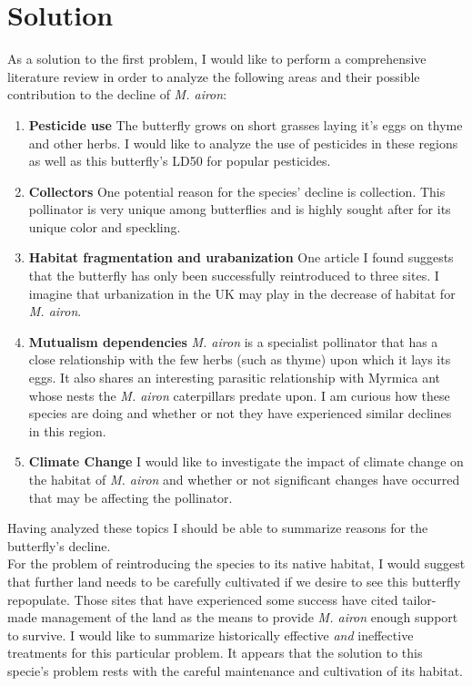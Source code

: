 \documentclass[12pt, twocolumn, letterpaper]{article}
\begin{document}
\section*{Solution}
As a solution to the first problem, I would like to perform a comprehensive literature review in order to analyze the following areas and their possible contribution to the decline of \textit{M. airon}:
\begin{enumerate}
\item \textbf{Pesticide use} The butterfly grows on short grasses laying it's eggs on thyme and other herbs. I would like to analyze the use of pesticides in these regions as well as this butterfly's LD50 for popular pesticides. 
\item \textbf{Collectors} One potential reason for the species' decline is collection. This pollinator is very unique among butterflies and is highly sought after for its unique color and speckling. 
\item \textbf{Habitat fragmentation and urabanization} One article I found suggests that the butterfly has only been successfully reintroduced to three sites. I imagine that urbanization in the UK may play in the decrease of habitat for \textit{M. airon}. 
\item \textbf{Mutualism dependencies} \textit{M. airon} is a specialist pollinator that has a close relationship with the few herbs (such as thyme) upon which it lays its eggs. It also shares an interesting parasitic relationship with Myrmica ant whose nests the \textit{M. airon} caterpillars predate upon. I am curious how these species are doing and whether or not they have experienced similar declines in this region.
\item \textbf{Climate Change} I would like to investigate the impact of climate change on the habitat of \textit{M. airon} and whether or not significant changes have occurred that may be affecting the pollinator.  

\end{enumerate}
Having analyzed these topics I should be able to summarize reasons for the butterfly's decline. \\

For the problem of reintroducing the species to its native habitat, I would
suggest that further land needs to be carefully cultivated if we desire to see
this butterfly repopulate. Those sites that have experienced some success have
cited tailor-made management of the land as the means to provide \textit{M.
  airon} enough support to survive. I would like to summarize historically
effective \textit{and} ineffective treatments for this particular problem. It
appears that the solution to this specie's problem rests with the careful
maintenance and cultivation of its habitat. \\
\end{document}
